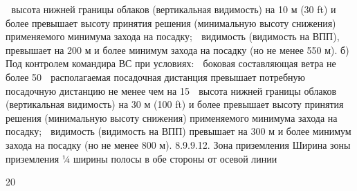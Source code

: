 	высота нижней границы облаков (вертикальная видимость) на 10 м (30 ft) и более превышает высоту принятия решения (минимальную высоту снижения) применяемого минимума захода на посадку;
	видимость (видимость на ВПП), превышает на 200 м и более минимум захода на посадку (но не менее 550 м).
б) Под контролем командира ВС при условиях:
	боковая составляющая ветра не более 50%
	располагаемая посадочная дистанция превышает потребную посадочную дистанцию не менее чем на 15%
	высота нижней границы облаков (вертикальная видимость) на 30 м (100 ft) и более превышает высоту принятия решения (минимальную высоту снижения) применяемого минимума захода на посадку;
	видимость (видимость на ВПП) превышает на 300 м и более минимум захода на посадку (но не менее 800 м).
8.9.9.12.	Зона приземления
Ширина зоны приземления
¼ ширины полосы в обе стороны от осевой линии																					
																	
																							
																							
			20																				
																							
																							
																							
																			
																			
